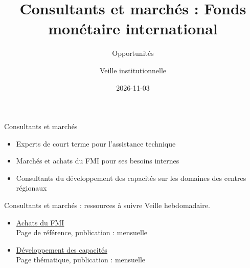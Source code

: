 \documentclass[aspectratio=169,11pt]{beamer}
\title{Consultants et marchés : Fonds monétaire international}
\subtitle{Opportunités}
\author{Veille institutionnelle}
\date{2026-11-03}
\begin{document}
\begin{frame}\titlepage\end{frame}

\begin{frame}{Consultants et marchés}
\begin{itemize}
\item Experts de court terme pour l'assistance technique
\item Marchés et achats du FMI pour ses besoins internes
\item Consultants du développement des capacités sur les domaines des centres régionaux
\end{itemize}
\end{frame}

\begin{frame}{Consultants et marchés : ressources à suivre}
\small
Veille hebdomadaire.
\begin{itemize}
\item \href{https://www.imf.org/en/About/Procurement}{Achats du FMI}\\{\footnotesize Page de référence, publication : mensuelle}
\item \href{https://www.imf.org/en/Capacity-Development}{Développement des capacités}\\{\footnotesize Page thématique, publication : mensuelle}
\end{itemize}
\end{frame}
\end{document}
